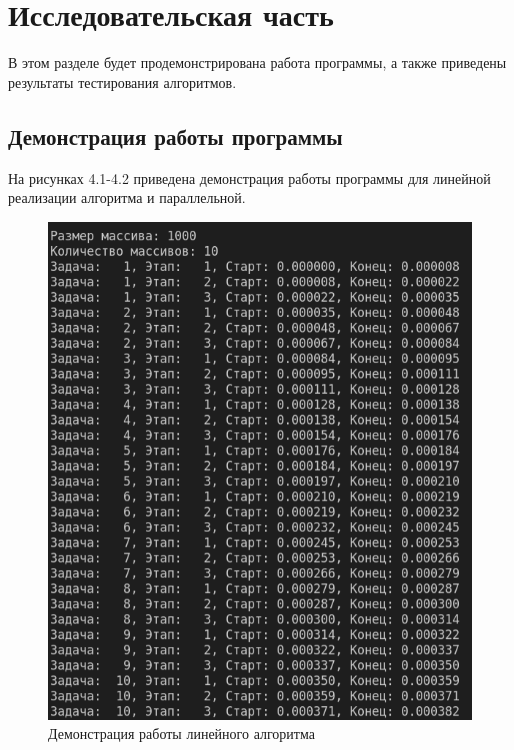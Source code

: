 \chapter{Исследовательская часть}
В этом разделе будет продемонстрирована работа программы, а также
приведены результаты тестирования алгоритмов.

\section{Демонстрация работы программы}
На рисунках 4.1-4.2 приведена демонстрация работы программы для линейной реализации алгоритма и параллельной.

\FloatBarrier
\begin{figure}[h]
	\begin{center}
		\includegraphics[]{inc/linear.png}
	\end{center}
	\caption{Демонстрация работы линейного алгоритма}
\end{figure}
\FloatBarrier

